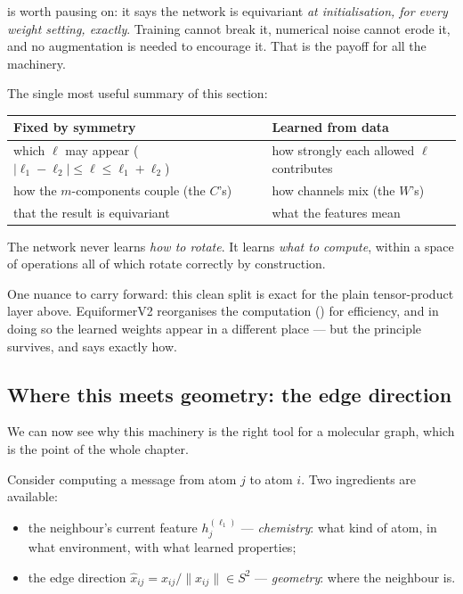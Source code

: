 \documentclass[11pt,a4paper]{report}
\theoremstyle{definition}
\theoremstyle{remark}
\begin{document}
 is worth pausing on: it says the network is
equivariant \emph{at initialisation, for every weight setting, exactly}.
Training cannot break it, numerical noise cannot erode it, and no
augmentation is needed to encourage it. That is the payoff for all the
machinery.

\begin{tcolorbox}[colback=green!3,colframe=green!35!black,title=Geometry is fixed; channels are learned]
The single most useful summary of this section:

\begin{center}
\begin{tabular}{ll}
\toprule
Fixed by symmetry & Learned from data \\
\midrule
which $\ell$ may appear ($|\ell_1-\ell_2|\le\ell\le\ell_1+\ell_2$) & how strongly each allowed $\ell$ contributes \\
how the $m$-components couple (the $C$'s) & how channels mix (the $W$'s) \\
that the result is equivariant & what the features mean \\
\bottomrule
\end{tabular}
\end{center}

The network never learns \emph{how to rotate}. It learns \emph{what to
compute}, within a space of operations all of which rotate correctly by
construction.

One nuance to carry forward: this clean split is exact for the plain
tensor-product layer above. EquiformerV2 reorganises the computation
() for efficiency, and in doing so the learned weights
appear in a different place --- but the principle survives, and
 says exactly how.
\end{tcolorbox}

\subsection{Where this meets geometry: the edge direction}
\label{sec:tp-meets-geometry}

We can now see why this machinery is the right tool for a molecular graph,
which is the point of the whole chapter.

Consider computing a message from atom $j$ to atom $i$. Two ingredients are
available:
\begin{itemize}[nosep]
\item the neighbour's current feature $h_j^{(\ell_1)}$ --- \emph{chemistry}:
what kind of atom, in what environment, with what learned properties;
\item the edge direction $\hat x_{ij}=x_{ij}/\|x_{ij}\|\in S^2$ ---
\emph{geometry}: where the neighbour is.
\end{itemize}
\end{document}
